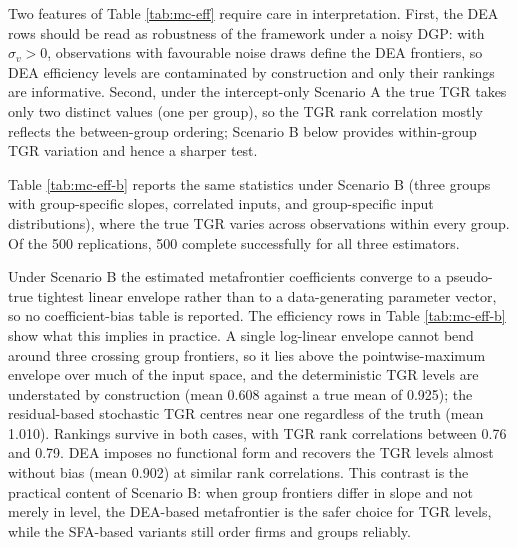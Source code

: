 Two features of Table \ref{tab:mc-eff} require care in interpretation.
First, the DEA rows should be read as robustness of the framework under a
noisy DGP: with \(\sigma_v > 0\), observations with favourable noise draws
define the DEA frontiers, so DEA efficiency levels are contaminated by
construction and only their rankings are informative. Second, under the
intercept-only Scenario A the true TGR takes only two distinct values (one
per group), so the TGR rank correlation mostly reflects the between-group
ordering; Scenario B below provides within-group TGR variation and hence a
sharper test.

Table \ref{tab:mc-eff-b} reports the same statistics under Scenario B
(three groups with group-specific slopes, correlated inputs, and
group-specific input distributions), where the true TGR varies across
observations within every group. Of the 500 replications,
500 complete successfully for all three estimators.

\begin{table}
\centering
\caption{\label{tab:mc-eff-b}Efficiency recovery under Scenario B: three groups with group-specific slopes, correlated log inputs, and group-specific input means (means over successful replications). The true TGR is computed against the pointwise maximum over the group frontiers; column definitions follow the Scenario A table.}
\centering
{}
\end{table}

Under Scenario B the estimated metafrontier coefficients converge to a
pseudo-true tightest linear envelope rather than to a data-generating
parameter vector, so no coefficient-bias table is reported. The efficiency
rows in Table \ref{tab:mc-eff-b} show what this implies in practice. A
single log-linear envelope cannot bend around three crossing group
frontiers, so it lies above the pointwise-maximum envelope over much of
the input space, and the deterministic TGR levels are understated by
construction (mean 0.608 against a true mean of 0.925); the residual-based
stochastic TGR centres near one regardless of the truth (mean 1.010).
Rankings survive in both cases, with TGR rank correlations between 0.76
and 0.79. DEA imposes no functional form and recovers the TGR levels
almost without bias (mean 0.902) at similar rank correlations. This
contrast is the practical content of Scenario B: when group frontiers
differ in slope and not merely in level, the DEA-based metafrontier is the
safer choice for TGR levels, while the SFA-based variants still order
firms and groups reliably.


